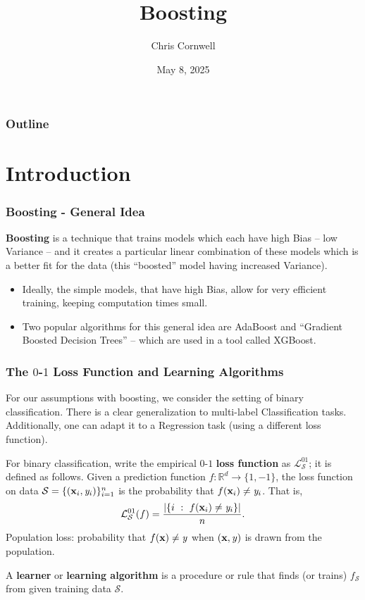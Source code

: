 \documentclass[smaller]{beamer}
\author{Chris Cornwell}
\date{May 8, 2025}
\title{Boosting}
\theoremstyle{example}
\newcommand{\x}{\textbf{x}}
\newcommand{\ix}[1]{{\it #1}}
\begin{document}
\begin{frame}
\titlepage
\end{frame}

\begin{frame}
    \frametitle{Outline}
    \tableofcontents
\end{frame}

\section{Introduction}

\begin{frame}
    \frametitle{Boosting - General Idea}

    \textbf{Boosting} is a technique that trains models which each have high Bias {--} low Variance {--} and it creates a particular linear combination of these models which is a better fit for the data (this ``boosted'' model having increased Variance).
    \pause
    \vspace{12pt}

    \begin{itemize}
        \item Ideally, the simple models, that have high Bias, allow for very efficient training, keeping computation times small.
        \pause
        \item Two popular algorithms for this general idea are AdaBoost and ``Gradient Boosted Decision Trees'' {--} which are used in a tool called XGBoost.
    \end{itemize}
    
\end{frame}

\begin{frame}
    \frametitle{The $0$-$1$ Loss Function and Learning Algorithms}
    For our assumptions with boosting, we consider the setting of binary classification. There is a clear generalization to multi-label Classification tasks. Additionally, one can adapt it to a Regression task (using a different loss function). 
    
    \pause
    For binary classification, write the empirical $0$-$1$ \textbf{loss function} as $\mathcal L_{\mathcal S}^{01}$; it is defined as follows. Given a prediction function $f:\mathbb R^d\to\{1, -1\}$, the loss function on data $\mathcal S = \{(\x_i,\ix y_i)\}_{i=1}^n$ is the probability that $f(\x_i) \ne \ix y_i$. That is, 
        \[\mathcal L_{\mathcal S}^{01}(f) = \frac{|\{i\ :\ f(\x_i) \ne \ix y_i\}|}{n}.\]
    \pause
    Population loss: probability that $f(\x) \ne \ix y$ when $(\x,\ix y)$ is drawn from the population.

    \pause
    A \textbf{learner} or \textbf{learning algorithm} is a procedure or rule that finds (or trains) $f_{\mathcal S}$ from given training data $\mathcal S$. 
\end{frame}
\end{document}

